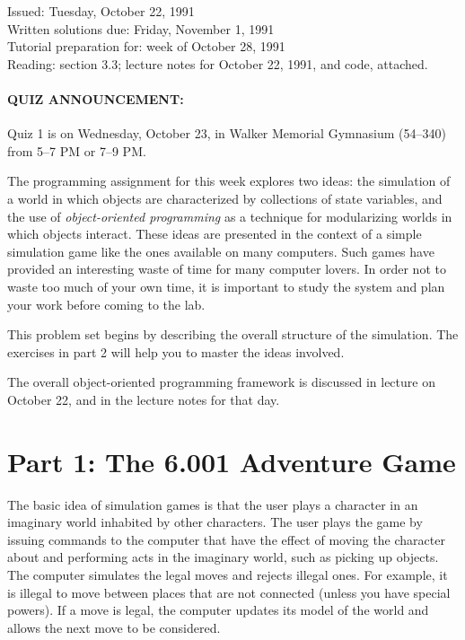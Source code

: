


\medskip

\begin{flushleft}
Issued:  Tuesday, October 22, 1991 \\
\smallskip
Written solutions due: Friday, November 1, 1991 \\  
\smallskip
Tutorial preparation for: week of October 28, 1991 \\
\smallskip
Reading: section 3.3; lecture notes for October 22, 1991, and code,
attached. \\ 
\end{flushleft}

\paragraph{QUIZ ANNOUNCEMENT:} Quiz 1 is on Wednesday, October 23, in
Walker Memorial Gymnasium (54--340) from 5--7 PM or 7--9 PM.  

The programming assignment for this week explores two ideas: the
simulation of a world in which objects are characterized by
collections of state variables, and the use of {\em object-oriented
programming} as a technique for modularizing worlds in which objects
interact.  These ideas are presented in the context of a simple
simulation game like the ones available on many computers.  Such games
have provided an interesting waste of time for many computer lovers.
In order not to waste too much of your own time, it is important to
study the system and plan your work before coming to the lab.

This problem set begins by describing the overall structure of the
simulation.  The exercises in part 2 will help you to master the ideas
involved.  

The overall object-oriented programming framework is discussed in
lecture on October 22, and in the lecture notes for that day.

\section{Part 1: The 6.001 Adventure Game}

The basic idea of simulation games is that the user plays a character
in an imaginary world inhabited by other characters. The user plays
the game by issuing commands to the computer that have the effect of
moving the character about and performing acts in the imaginary world,
such as picking up objects.  The computer simulates the legal moves
and rejects illegal ones.  For example, it is illegal to move between
places that are not connected (unless you have special powers).  If a
move is legal, the computer updates its model of the world and allows
the next move to be considered.


